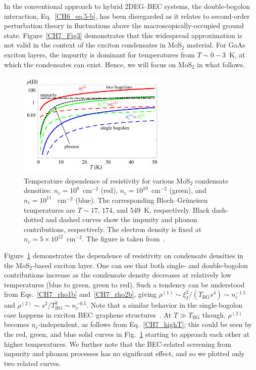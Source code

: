 In the conventional approach to hybrid 2DEG--BEC systems, the double-bogolon interaction, Eq.~\eqref{CH6_eq.5-b}, has been disregarded as it relates to second-order perturbation theory in fluctuations above the macroscopically-occupied ground state.
Figure~\ref{CH7_Fig3} demonstrates that this widespread approximation is not valid in the context of the  exciton condensates in MoS$_2$ material.
For GaAs exciton layers, the impurity is dominant for temperatures from $T\sim0-3$~K, at which the condensates can exist.
Hence, we will focus on MoS$_2$ in what follows.

%
%
%
\begin{figure}[ht]
\centering
\includegraphics[width=0.65\textwidth]{Fig/Ch6/Fig2ER.pdf}
\caption[Temperature-dependent resistivity with different condensate densities]{Temperature dependence of resistivity for various MoS$_2$ condensate densities: $n_c=10^8$~cm$^{-2}$ (red), $n_c=10^{10}$~cm$^{-2}$ (green), and $n_c=10^{11}$~
cm$^{-2}$ (blue).
The corresponding Bloch--Gr\"{u}neisen temperatures are $T\sim17$, $174$, and $549$~K, respectively. Black dash-dotted and dashed curves show the impurity and phonon contributions, respectively.
The electron density is fixed at $n_e=5\times10^{12}$~cm$^{-2}$. The figure is taken from~\cite{Villegas:2019aa}.}
\label{CH7_Fig4}
\end{figure}
%
%
%

Figure~\ref{CH7_Fig4} demonstrates the dependence of resistivity on condensate densities in the MoS$_2$-based exciton layer.
One can see that both single- and double-bogolon contributions increase as the condensate density decreases at relatively low temperatures (blue to green, green to red).
Such a tendency can be understood from Eqs.~\eqref{CH7_rho1b} and~\eqref{CH7_rho2b}, giving $\rho^{(1)}\sim \xi_I^2/(T_\textrm{BG}s^4)\sim n_c^{-1.5}$ and $\rho^{(2)}\sim s^2/T^3_\textrm{BG}\sim n_c^{-0.5}$.
Note that a similar behavior in the single-bogolon case happens in exciton BEC--graphene structures~\cite{Sun:2019aa}.
At $T\gg T_\textrm{BG}$ though, $\rho^{(2)}$ becomes $n_c$-independent, as follows from Eq.~\eqref{CH7_highT}; this could be seen by the red, green, and blue solid curves in Fig.~\ref{CH7_Fig4} starting to approach each other at higher temperatures.
We further note that the BEC-related screening from impurity and phonon processes has no significant effect, and so we plotted only two related curves.

